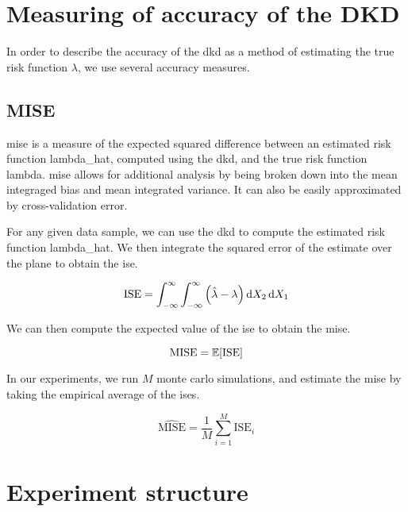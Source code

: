 \section{Measuring of accuracy of the DKD}
\label{sec:method:accuracy}

In order to describe the accuracy of the \gls{dkd} as a method of estimating the true risk function \(\lambda\),
we use several accuracy measures.

\subsection{MISE}
\label{subsec:method:MISE}

\Gls{mise} is a measure of the expected squared difference between an estimated risk function \gls{lambda_hat},
computed using the \gls{dkd}, and the true risk function \gls{lambda}.
\Gls{mise} allows for additional analysis by being broken down into the mean integraged bias and mean integrated variance.
It can also be easily approximated by cross-validation error.

For any given data sample, we can use the \gls{dkd} to compute the estimated risk function \gls{lambda_hat}.
We then integrate the squared error of the estimate over the plane to obtain the \gls{ise}.

\begin{equation}
    \mbox{ISE} = \int_{-\infty}^{\infty} \int_{-\infty}^{\infty} \left( \hat{\lambda} - \lambda \right) \mathop{}\!\mathrm{d}{X_2} \mathop{}\!\mathrm{d}{X_1}
\end{equation}

We can then compute the expected value of the \gls{ise} to obtain the \gls{mise}.

\begin{equation}
    \mbox{MISE} = \mathbb{E} [\mbox{ISE}]
\end{equation}

In our experiments, we run \(M\) monte carlo simulations, and estimate the \gls{mise} by taking the empirical average of the \glspl{ise}.

\begin{equation}
    \hat{\mbox{MISE}} = \frac{1}{M} \sum_{i=1}^{M} \mbox{ISE}_i
\end{equation}

\section{Experiment structure}
\label{sec:method:experiment_structure}

